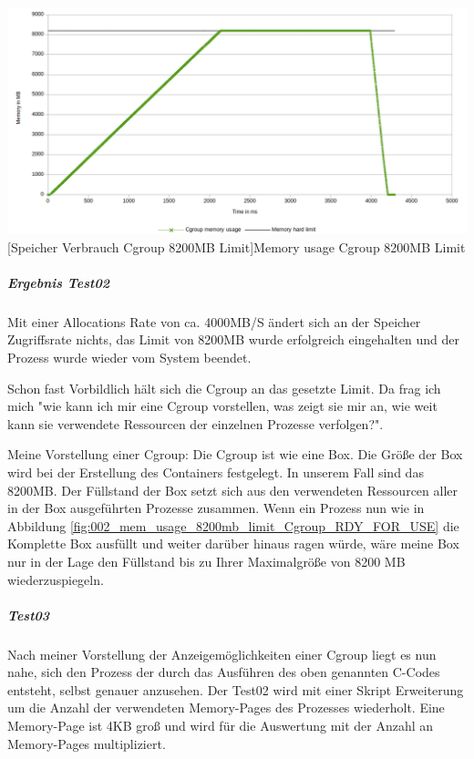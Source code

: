 \vspace{1em}
\begin{minipage}{\linewidth}
	\centering
	\includegraphics[width=1\linewidth]{pics/002_mem_usage_8200mb_limit_Cgroup_RDY_FOR_USE.png}
	[Speicher Verbrauch Cgroup 8200MB Limit]{Memory usage Cgroup 8200MB Limit}
	\label{fig:002_mem_usage_8200mb_limit_Cgroup_RDY_FOR_USE}
\end{minipage}

\subparagraph{Ergebnis Test02}
Mit einer Allocations Rate von ca. 4000MB/S ändert sich an der Speicher Zugriffsrate nichts, das Limit von 8200MB wurde erfolgreich eingehalten und der Prozess wurde wieder vom System beendet.

Schon fast Vorbildlich hält sich die Cgroup an das gesetzte Limit. Da frag ich mich "wie kann ich mir eine Cgroup vorstellen, was zeigt sie mir an, wie weit kann sie verwendete Ressourcen der einzelnen Prozesse verfolgen?". 

Meine Vorstellung einer Cgroup:
Die Cgroup ist wie eine Box. Die Größe der Box wird bei der Erstellung des Containers festgelegt. In unserem Fall sind das 8200MB. Der Füllstand der Box setzt sich aus den verwendeten Ressourcen aller in der Box ausgeführten Prozesse zusammen. Wenn ein Prozess nun wie in Abbildung \ref{fig:002_mem_usage_8200mb_limit_Cgroup_RDY_FOR_USE} die Komplette Box ausfüllt und weiter darüber hinaus ragen würde, wäre meine Box nur in der Lage den Füllstand bis zu Ihrer Maximalgröße von 8200 MB wiederzuspiegeln.

\subparagraph{Test03}
Nach meiner Vorstellung der Anzeigemöglichkeiten einer Cgroup liegt es nun nahe, sich den Prozess der durch das Ausführen des oben genannten C-Codes entsteht, selbst genauer anzusehen. Der Test02 wird mit einer Skript Erweiterung um die Anzahl der verwendeten Memory-Pages des Prozesses wiederholt. Eine Memory-Page ist 4KB groß und wird für die Auswertung mit der Anzahl an Memory-Pages multipliziert.

